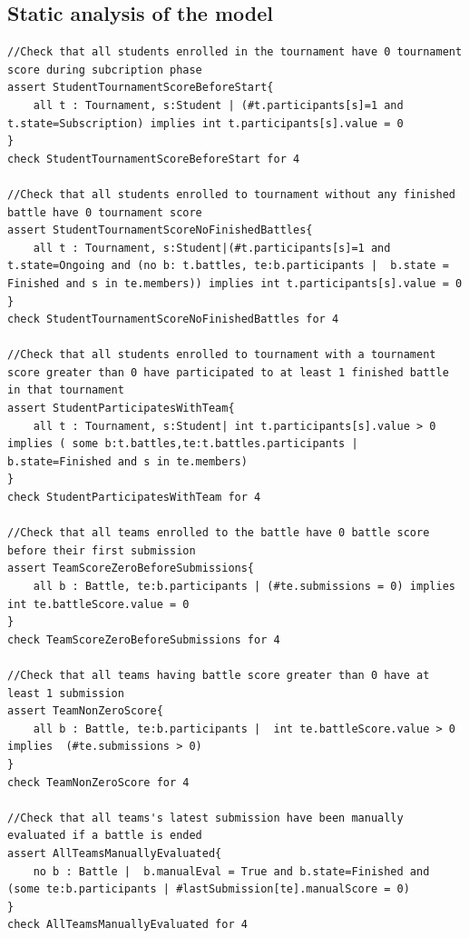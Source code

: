 \subsection{Static analysis of the model}
\begin{lstlisting}[language=alloy]
//Check that all students enrolled in the tournament have 0 tournament score during subcription phase
assert StudentTournamentScoreBeforeStart{
    all t : Tournament, s:Student | (#t.participants[s]=1 and t.state=Subscription) implies int t.participants[s].value = 0
}
check StudentTournamentScoreBeforeStart for 4

//Check that all students enrolled to tournament without any finished battle have 0 tournament score
assert StudentTournamentScoreNoFinishedBattles{
    all t : Tournament, s:Student|(#t.participants[s]=1 and t.state=Ongoing and (no b: t.battles, te:b.participants |  b.state = Finished and s in te.members)) implies int t.participants[s].value = 0
}
check StudentTournamentScoreNoFinishedBattles for 4

//Check that all students enrolled to tournament with a tournament score greater than 0 have participated to at least 1 finished battle in that tournament
assert StudentParticipatesWithTeam{
    all t : Tournament, s:Student| int t.participants[s].value > 0 implies ( some b:t.battles,te:t.battles.participants | b.state=Finished and s in te.members)
}
check StudentParticipatesWithTeam for 4

//Check that all teams enrolled to the battle have 0 battle score before their first submission
assert TeamScoreZeroBeforeSubmissions{
    all b : Battle, te:b.participants | (#te.submissions = 0) implies int te.battleScore.value = 0
}
check TeamScoreZeroBeforeSubmissions for 4

//Check that all teams having battle score greater than 0 have at least 1 submission
assert TeamNonZeroScore{
    all b : Battle, te:b.participants |  int te.battleScore.value > 0  implies  (#te.submissions > 0)
}
check TeamNonZeroScore for 4

//Check that all teams's latest submission have been manually evaluated if a battle is ended
assert AllTeamsManuallyEvaluated{
    no b : Battle |  b.manualEval = True and b.state=Finished and (some te:b.participants | #lastSubmission[te].manualScore = 0)
}
check AllTeamsManuallyEvaluated for 4

\end{lstlisting}

